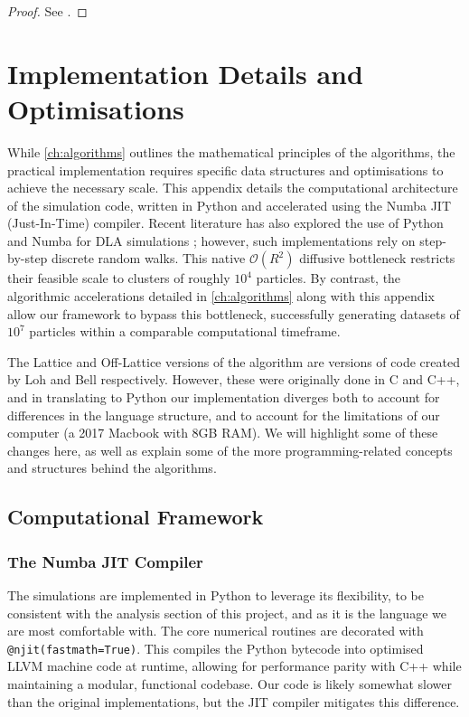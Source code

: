 \documentclass[12pt, a4paper, oneside]{report}
\theoremstyle{remark}
\begin{document}
\begin{proof}
See \citet[Chapter 6.1]{Ahlfors1979}.
\end{proof}


\chapter{Implementation Details and Optimisations}
\label{app:implementation}

While \cref{ch:algorithms} outlines the mathematical principles of the algorithms, the practical implementation requires specific data structures and optimisations to achieve the necessary scale. This appendix details the computational architecture of the simulation code, written in Python and accelerated using the Numba JIT (Just-In-Time) compiler. Recent literature has also explored the use of Python and Numba for DLA simulations \cite{herho2026}; however, such implementations rely on step-by-step discrete random walks. This native $\mathcal{O}(R^2)$ diffusive bottleneck restricts their feasible scale to clusters of roughly $10^4$ particles. By contrast, the algorithmic accelerations detailed in \cref{ch:algorithms} along with this appendix allow our framework to bypass this bottleneck, successfully generating datasets of $10^7$ particles within a comparable computational timeframe.

The Lattice and Off-Lattice versions of the algorithm are versions of code created by Loh \cite{Loh2014} and Bell \cite{Bell2019} respectively. However, these were originally done in C and C++, and in translating to Python our implementation diverges both to account for differences in the language structure, and to account for the limitations of our computer (a 2017 Macbook with 8GB RAM). We will highlight some of these changes here, as well as explain some of the more programming-related concepts and structures behind the algorithms.

\section{Computational Framework}

\subsection{The Numba JIT Compiler}
The simulations are implemented in Python to leverage its flexibility, to be consistent with the analysis section of this project, and as it is the language we are most comfortable with. The core numerical routines are decorated with \texttt{@njit(fastmath=True)}. This compiles the Python bytecode into optimised LLVM machine code at runtime, allowing for performance parity with C++ while maintaining a modular, functional codebase. Our code is likely somewhat slower than the original implementations, but the JIT compiler mitigates this difference.
\end{document}
